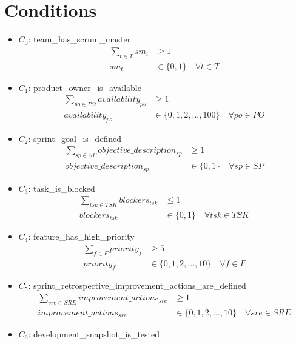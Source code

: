 \documentclass{article}
\begin{document}
\section{Conditions}
\begin{itemize}
    \item $C_0$: team\_has\_scrum\_master
        \begin{align*}
            \sum_{t \in T} sm_t &\geq 1 \\
            sm_t &\in \{0, 1\} \quad \forall t \in T
        \end{align*}
    \item $C_1$: product\_owner\_is\_available
        \begin{align*}
            \sum_{po \in PO} availability_{po} &\geq 1 \\
            availability_{po} &\in \{0, 1, 2, ..., 100\} \quad \forall po \in PO
        \end{align*}
    \item $C_2$: sprint\_goal\_is\_defined
        \begin{align*}
            \sum_{sp \in SP} objective\_description_{sp} &\geq 1 \\
            objective\_description_{sp} &\in \{0, 1\} \quad \forall sp \in SP
        \end{align*}
    \item $C_3$: task\_is\_blocked
        \begin{align*}
            \sum_{tsk \in TSK} blockers_{tsk} &\leq 1 \\
            blockers_{tsk} &\in \{0, 1\} \quad \forall tsk \in TSK
        \end{align*}
    \item $C_4$: feature\_has\_high\_priority
        \begin{align*}
            \sum_{f \in F} priority_f &\geq 5 \\
            priority_f &\in \{0, 1, 2, ..., 10\} \quad \forall f \in F
        \end{align*}
    \item $C_5$: sprint\_retrospective\_improvement\_actions\_are\_defined
        \begin{align*}
            \sum_{sre \in SRE} improvement\_actions_{sre} &\geq 1 \\
            improvement\_actions_{sre} &\in \{0, 1, 2, ..., 10\} \quad \forall sre \in SRE
        \end{align*}
    \item $C_6$: development\_snapshot\_is\_tested

\end{itemize}
\end{document}
